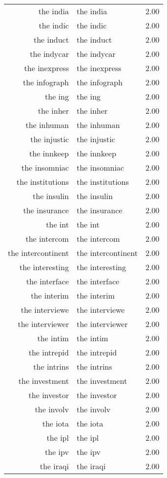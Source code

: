 \begin{table}[ht]
\begin{tabular}{rlr}
  the india & the india & 2.00 \\ 
  the indic & the indic & 2.00 \\ 
  the induct & the induct & 2.00 \\ 
  the indycar & the indycar & 2.00 \\ 
  the inexpress & the inexpress & 2.00 \\ 
  the infograph & the infograph & 2.00 \\ 
  the ing & the ing & 2.00 \\ 
  the inher & the inher & 2.00 \\ 
  the inhuman & the inhuman & 2.00 \\ 
  the injustic & the injustic & 2.00 \\ 
  the innkeep & the innkeep & 2.00 \\ 
  the insomniac & the insomniac & 2.00 \\ 
  the institutions & the institutions & 2.00 \\ 
  the insulin & the insulin & 2.00 \\ 
  the insurance & the insurance & 2.00 \\ 
  the int & the int & 2.00 \\ 
  the intercom & the intercom & 2.00 \\ 
  the intercontinent & the intercontinent & 2.00 \\ 
  the interesting & the interesting & 2.00 \\ 
  the interface & the interface & 2.00 \\ 
  the interim & the interim & 2.00 \\ 
  the interviewe & the interviewe & 2.00 \\ 
  the interviewer & the interviewer & 2.00 \\ 
  the intim & the intim & 2.00 \\ 
  the intrepid & the intrepid & 2.00 \\ 
  the intrins & the intrins & 2.00 \\ 
  the investment & the investment & 2.00 \\ 
  the investor & the investor & 2.00 \\ 
  the involv & the involv & 2.00 \\ 
  the iota & the iota & 2.00 \\ 
  the ipl & the ipl & 2.00 \\ 
  the ipv & the ipv & 2.00 \\ 
  the iraqi & the iraqi & 2.00 \\ 

\end{tabular}
\end{table}
